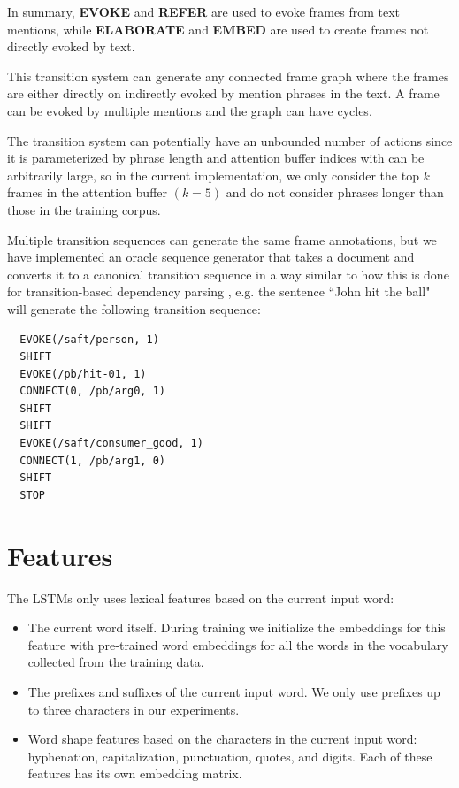 \documentclass[11pt,a4paper]{article}
\begin{document}
In summary, {\bf EVOKE} and {\bf REFER} are used to evoke frames from text
mentions, while {\bf ELABORATE} and {\bf EMBED} are used to create frames not
directly evoked by text.

This transition system can generate any connected frame graph where the frames
are either directly on indirectly evoked by mention phrases in the text. A frame
can be evoked by multiple mentions and the graph can have cycles.

The transition system can potentially have an unbounded number of actions since
it is parameterized by phrase length and attention buffer indices with can be
arbitrarily large, so in the current implementation, we only consider the
top $k$ frames in the attention buffer $(k=5)$ and do not consider phrases
longer than those in the training corpus.

Multiple transition sequences can generate the same frame annotations, but we
have implemented an oracle sequence generator that takes a document and converts
it to a canonical transition sequence in a way similar to how this is done
for transition-based dependency parsing \cite{nivre2006}, e.g. the sentence
``John hit the ball" will generate the following transition sequence:
\begin{verbatim}
  EVOKE(/saft/person, 1)
  SHIFT
  EVOKE(/pb/hit-01, 1)
  CONNECT(0, /pb/arg0, 1)
  SHIFT
  SHIFT
  EVOKE(/saft/consumer_good, 1)
  CONNECT(1, /pb/arg1, 0)
  SHIFT
  STOP
\end{verbatim}

\section{Features}
\label{sec:features}

The LSTMs only uses lexical features based on the current input word:

\begin{itemize}
  \item The current word itself. During training we initialize the embeddings
  for this feature with pre-trained word embeddings \cite{mikolov2013} for all
  the words in the vocabulary collected from the training data.
  \item The prefixes and suffixes of the current input word. We only use
  prefixes up to three characters in our experiments.
  \item Word shape features based on the characters in the current input word:
  hyphenation, capitalization, punctuation, quotes, and digits. Each of these
  features has its own embedding matrix.
\end{itemize}
\end{document}

